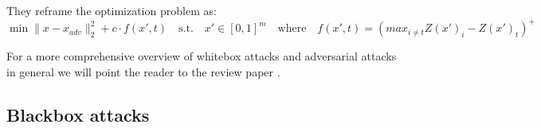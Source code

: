 They reframe the optimization problem as:
$$\min \lVert x - x_{adv} \rVert^2_2 + c \cdot f(x', t) \quad \text{s.t.} \quad x' \in [0, 1]^m \quad \text{where} \quad f(x', t) = (max_{i \neq t} Z(x')_i - Z(x')_t)^+$$

For a more comprehensive overview of whitebox attacks and adversarial attacks in general we will point the reader to the review paper \cite{xu2019adversarial}.


\subsection{Blackbox attacks}






